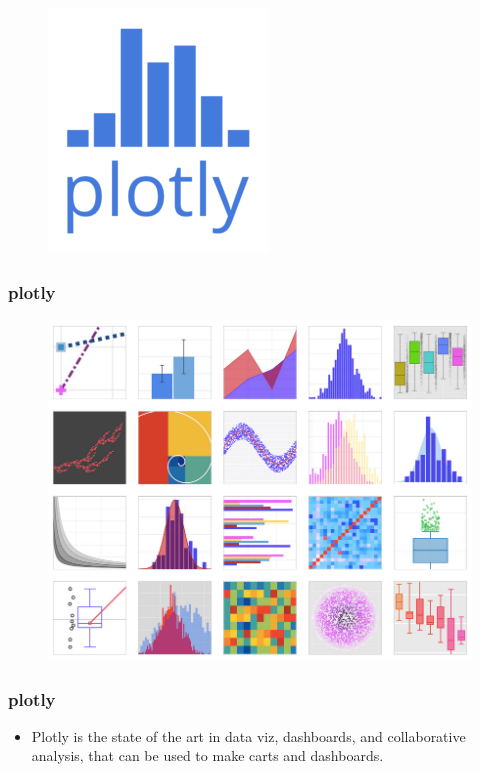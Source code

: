 \documentclass{beamer}
\begin{document}
	\begin{frame}
\begin{figure}
\centering
\includegraphics[width=0.7\linewidth]{plotlylogo}
\end{figure}
\end{frame}
\begin{frame}
\frametitle{plotly}
\large		
\begin{figure}
\centering
\includegraphics[width=0.7\linewidth]{plotlygallery}
\end{figure}

\end{frame}
\begin{frame}
\frametitle{plotly}
\large	
\begin{itemize}
	\item Plotly is the state of the art in data viz, dashboards, and collaborative analysis, that can be used to make carts and dashboards.
\end{itemize}
\end{frame}
\end{document}
